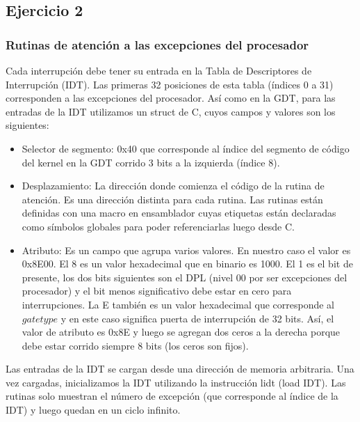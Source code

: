 \subsection{Ejercicio 2}
\subsubsection{Rutinas de atención a las excepciones del procesador}
Cada interrupción debe tener su entrada en la Tabla de Descriptores de Interrupción (IDT). Las primeras 32 posiciones de esta tabla (índices 0 a 31) corresponden a las excepciones del procesador.\newline
Así como en la GDT, para las entradas de la IDT utilizamos un struct de C, cuyos campos y valores son los siguientes:
\begin{itemize}
\item Selector de segmento: 0x40 que corresponde al índice del segmento de código del kernel en la GDT corrido 3 bits a la izquierda (índice 8).
\item Desplazamiento: La dirección donde comienza el código de la rutina de atención. Es una dirección distinta para cada rutina. Las rutinas están definidas con una macro en ensamblador cuyas etiquetas están declaradas como símbolos globales para poder referenciarlas luego desde C.
\item Atributo: Es un campo que agrupa varios valores. En nuestro caso el valor es 0x8E00. El 8 es un valor hexadecimal que en binario es 1000. El 1 es el bit de presente, los dos bits siguientes son el DPL (nivel 00 por ser excepciones del procesador) y el bit menos significativo debe estar en cero para interrupciones. La E también es un valor hexadecimal que corresponde al $gate type$ y en este caso significa puerta de interrupción de 32 bits.  Así, el valor de atributo es 0x8E y luego se agregan dos ceros a la derecha porque debe estar corrido siempre 8 bits (los ceros son fijos).
\end{itemize}
Las entradas de la IDT se cargan desde una dirección de memoria arbitraria. Una vez cargadas, inicializamos la IDT utilizando la instrucción lidt (load IDT).\newline
Las rutinas solo muestran el número de excepción (que corresponde al índice de la IDT) y luego quedan en un ciclo infinito.
